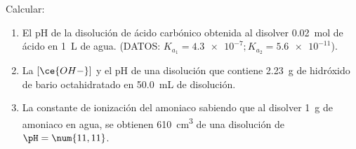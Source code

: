 Calcular:
\begin{enumerate}[label={\alph*)},font={\color{red!50!black}\bfseries}]
    \item El pH de la disolución de ácido carbónico obtenida al disolver \SI{0,02}{\mol} de ácido en \SI{1}{\liter} de agua. (DATOS: $K_{a_1} = \num{4,3e-7}; K_{a_2} = \num{5,6e-11}$).
    \item La $[\ce{OH-}]$ y el pH de una disolución que contiene \SI{2,23}{\gram} de hidróxido de bario octahidratado en \SI{50,0}{\milli\liter} de disolución.
    \item La constante de ionización del amoniaco sabiendo que al disolver \SI{1}{\gram} de amoniaco en agua, se obtienen \SI{610}{\cubic\centi\meter} de una disolución de $\pH = \num{11,11}$.
\end{enumerate}
